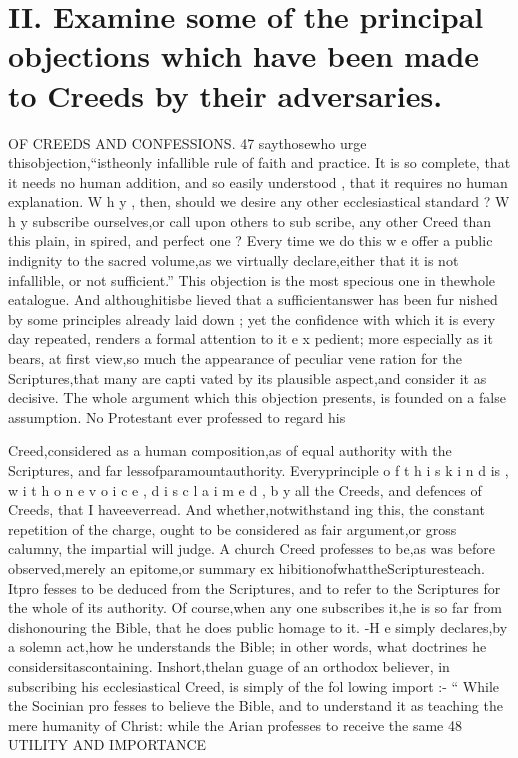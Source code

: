 \documentclass[
]{book}
\begin{document}
\hypertarget{ii.-examine-some-of-the-principal-objections-which-have-been-made-to-creeds-by-their-adversaries.}{%
\section{II. Examine some of the principal objections which have been made to Creeds by their adversaries.}\label{ii.-examine-some-of-the-principal-objections-which-have-been-made-to-creeds-by-their-adversaries.}}

OF CREEDS AND CONFESSIONS. 47
saythosewho urge thisobjection,``istheonly infallible rule of faith and practice. It is so
complete, that it needs no human addition, and so easily understood , that it requires no
human explanation. W h y , then, should we desire any other ecclesiastical standard ? W h y subscribe ourselves,or call upon others to sub scribe, any other Creed than this plain, in spired, and perfect one ? Every time we do this w e offer a public indignity to the sacred volume,as we virtually declare,either that it is not infallible, or not sufficient.''
This objection is the most specious one in thewhole eatalogue. And althoughitisbe lieved that a sufficientanswer has been fur nished by some principles already laid down ; yet the confidence with which it is every day repeated, renders a formal attention to it e x pedient; more especially as it bears, at first view,so much the appearance of peculiar vene ration for the Scriptures,that many are capti
vated by its plausible aspect,and consider it as decisive.
The whole argument which this objection presents, is founded on a false assumption.
No Protestant ever professed to regard his

Creed,considered as a human composition,as of equal authority with the Scriptures, and far
lessofparamountauthority. Everyprinciple o f t h i s k i n d is , w i t h o n e v o i c e , d i s c l a i m e d , b y
all the Creeds, and defences of Creeds, that I
haveeverread. And whether,notwithstand
ing this, the constant repetition of the charge, ought to be considered as fair argument,or
gross calumny, the impartial will judge. A church Creed professes to be,as was before observed,merely an epitome,or summary ex hibitionofwhattheScripturesteach. Itpro fesses to be deduced from the Scriptures, and
to refer to the Scriptures for the whole of its authority. Of course,when any one subscribes it,he is so far from dishonouring the Bible, that he does public homage to it. -H e simply declares,by a solemn act,how he understands
the Bible; in other words, what doctrines he
considersitascontaining. Inshort,thelan
guage of an orthodox believer, in subscribing
his ecclesiastical Creed, is simply of the fol
lowing import :- `` While the Socinian pro fesses to believe the Bible, and to understand
it as teaching the mere humanity of Christ: while the Arian professes to receive the same
48 UTILITY AND IMPORTANCE
\end{document}
